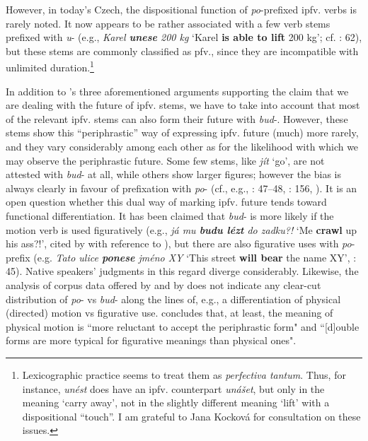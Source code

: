 \documentclass[output=paper,colorlinks,citecolor=brown]{langscibook}
\begin{document}
However, in today’s Czech, the dispositional function of \textit{po}-prefixed ipfv. verbs is rarely noted. It now appears to be rather associated with a few verb stems prefixed with\textit{ u}- (e.g., \textit{Karel \textbf{unese} 200 kg} ‘Karel \textbf{is able to lift} 200 kg’; cf. \cite{Mrhačová1993}: 62), but these stems are commonly classified as pfv., since they are incompatible with unlimited duration.\footnote{Lexicographic practice seems to treat them as \textit{perfectiva tantum}. Thus, for instance, \textit{unést} does have an ipfv. counterpart \textit{unášet}, but only in the meaning ‘carry away’, not in the slightly different meaning ‘lift’ with a dispositional ``touch''. I am grateful to Jana Kocková for consultation on these issues.}

\largerpage[1.5]

In addition to \citeauthor{Kopečný1962}’s three aforementioned arguments supporting the claim that we are dealing with the future of ipfv. stems, we have to take into account that most of the relevant ipfv. stems can also form their future with \textit{bud}-. However, these stems show this ``periphrastic'' way of expressing ipfv. future (much) more rarely, and they vary considerably among each other as for the likelihood with which we may observe the periphrastic future. Some few stems, like \textit{jít} ‘go’, are not attested with \textit{bud}- at all, while others show larger figures; however the bias is always clearly in favour of prefixation with \textit{po}- (cf., e.g., \cite{Kopečný1962}: 47--48, \cite{VAGSČ2021}: 156, \cite{SaicováŘímalová2023}). It is an open question whether this dual way of marking ipfv. future tends toward functional differentiation. It has been claimed that \textit{bud}- is more likely if the motion verb is used figuratively (e.g., \textit{já mu \textbf{budu lézt} do zadku?!} ‘Me \textbf{crawl} up his ass?!’, cited by \cite[45]{Galton1976} with reference to \cite{Poldauf1948}), but there are also figurative uses with \textit{po}-prefix (e.g. \textit{Tato ulice \textbf{ponese} jméno XY} ‘This street \textbf{will bear} the name XY’, \cite{Galton1976}: 45). Native speakers’ judgments in this regard diverge considerably. Likewise, the analysis of corpus data offered by \citet[181]{ŠevčíkováPanevová2018} and by \citet[]{SaicováŘímalová2023} does not indicate any clear-cut distribution of \textit{po}- vs \textit{bud}- along the lines of, e.g., a differentiation of physical (directed) motion vs figurative use. \citet[]{SaicováŘímalová2023} concludes that, at least, the meaning of physical motion is ``more reluctant to accept the periphrastic form" and ``[d]ouble forms are more typical for figurative meanings than physical ones".
\end{document}
